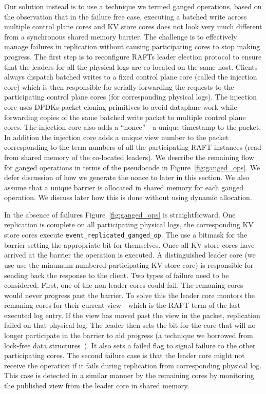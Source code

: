 \documentclass[10pt, preprint, nonatbib]{sigplanconf}
\begin{document}
Our solution instead is to use a technique we termed ganged operations, based on
the observation that in the failure free case, executing a batched write across
multiple control plane cores and KV store cores does not look very much
different from a synchronous shared memory barrier. The challenge is to
effectively manage failures in replication without causing participating cores
to stop making progress. The first step is to reconfigure RAFTs leader election
protocol to ensure that the leaders for all the physical logs are co-located on
the same host. Clients always dispatch batched writes to a fixed control plane
core (called the injection core) which is then responsible for serially
forwarding the requests to the participating control plane cores (for
corresponding physical logs). The injection core uses DPDKs packet cloning
primitives to avoid dataplane work while forwarding copies of the same batched
write packet to multiple control plane cores. The injection core also adds a
``nonce'' - a unique timestamp to the packet. In addition the injection core
adds a unique view number to the packet corresponding to the term numbers of all
the participating RAFT instances (read from shared memory of the co-located leaders).
We describe the remaining flow for ganged operations in terms of the pseudocode
in Figure~\ref{fig:ganged_ops}. We defer discussion of how we generate the nonce
to later in this section. We also assume that a unique barrier is allocated in
shared memory for each ganged operation. We discuss later how this is done
without using dynamic allocation.

In the absence of failures Figure~\ref{fig:ganged_ops} is straightforward. One
replication is complete on all participating physical logs, the corresponding KV
store cores execute {\tt event\_replicated\_ganged\_op}. The use a bitmask for
the barrier setting the appropriate bit for themselves. Once all KV store cores
have arrived at the barrier the operation is executed. A distinguished leader
core (we use use the minumum numbered participating KV store core) is
responsible for sending back the response to the client. Two types of failure
need to be considered. First, one of the non-leader cores could fail. The
remaning cores would never progress past the barrier. To solve this the leader
core montors the remaning cores for their current view - which is the RAFT term
of the last executed log entry. If the view has moved past the view in the
packet, replication failed on that physical log. The leader then sets the bit
for the core that will no longer participate in the barrier to aid progress (a
technique we borrowed from lock-free data structures~\cite{lock-free}). It also
sets a failed flag to signal failure to the other participating cores. The
second failure case is that the leader core might not receive the operation if
it fails during replication from corresponding physical log. This case is
detected in a similar manner by the remaining cores by monitoring the published
view from the leader core in shared memory.
\end{document}

